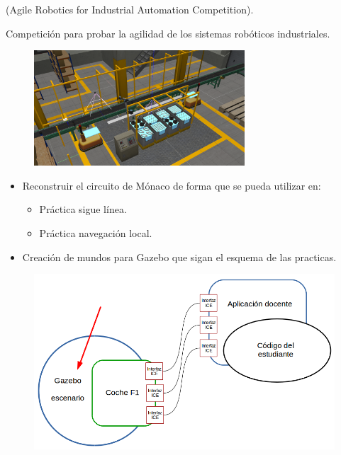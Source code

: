 \documentclass[notes,slidesec,a4]{seminar}
\begin{document}
\begin{hslide}
	\begin{center}(Agile Robotics for Industrial Automation Competition). \end{center}
	Competición para probar la agilidad de los sistemas robóticos industriales.
	\begin{center}
		\begin{figure}
			\includegraphics[width=0.7\textwidth]{ariac01.png}
		\end{figure}
	\end{center}
\end{hslide}


\begin{hslide}
	\begin{itemize}
		\item Reconstruir el circuito de Mónaco de forma que se pueda utilizar en:
		\begin{itemize}
			\item Práctica sigue línea.
			\item Práctica navegación local.
		\end{itemize}
		\item Creación de mundos para Gazebo que sigan el esquema de las practicas.
	\end{itemize}
\end{hslide}

\begin{hslide}
	\begin{center}
		\begin{figure}
			\includegraphics[width=\textwidth]{graficof1.png}
		\end{figure}
	\end{center}
\end{hslide}
\end{document}
